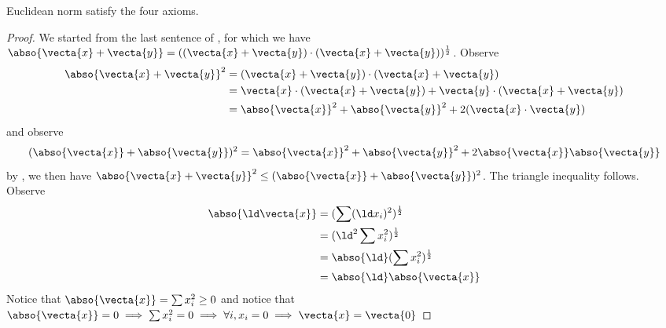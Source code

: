\documentclass{report}
\begin{document}
\begin{theorem}
\label{1.6.5}
Euclidean norm satisfy the four axioms.
\end{theorem}
\begin{proof}
We started from the last sentence of , for which we have $\abso{\vecta{x}+\vecta{y}}=((\vecta{x}+\vecta{y})\cdot(\vecta{x}+\vecta{y}))^{\frac{1}{2}}$. Observe
\begin{align*}
\abso{\vecta{x}+\vecta{y}}^2&=(\vecta{x}+\vecta{y})\cdot(\vecta{x}+\vecta{y})\\
&=\vecta{x}\cdot(\vecta{x}+\vecta{y})+\vecta{y}\cdot(\vecta{x}+\vecta{y})\\
&=\abso{\vecta{x}}^2+\abso{\vecta{y}}^2+2(\vecta{x}\cdot\vecta{y})
\end{align*}
and observe
\begin{equation*}
  (\abso{\vecta{x}}+\abso{\vecta{y}})^2=\abso{\vecta{x}}^2+\abso{\vecta{y}}^2+2\abso{\vecta{x}}\abso{\vecta{y}}
\end{equation*}
by , we then have $\abso{\vecta{x}+\vecta{y}}^2\leq (\abso{\vecta{x}}+\abso{\vecta{y}})^2$. The triangle inequality follows.\\

Observe
\begin{align*}
\abso{\ld\vecta{x}}&=(\sum (\ld x_i)^2)^{\frac{1}{2}}\\
&=(\ld ^2\sum x_i^2)^{\frac{1}{2}}\\
&=\abso{\ld }(\sum x_i^2)^{\frac{1}{2}}\\
&=\abso{\ld }\abso{\vecta{x}}
\end{align*}
Notice that $\abso{\vecta{x}}=\sum x_i^2\geq 0$ and notice that $\abso{\vecta{x}}=0\implies \sum x_i^2=0\implies \forall i,x_i=0\implies \vecta{x}=\vecta{0}$
\end{proof}
\end{document}
